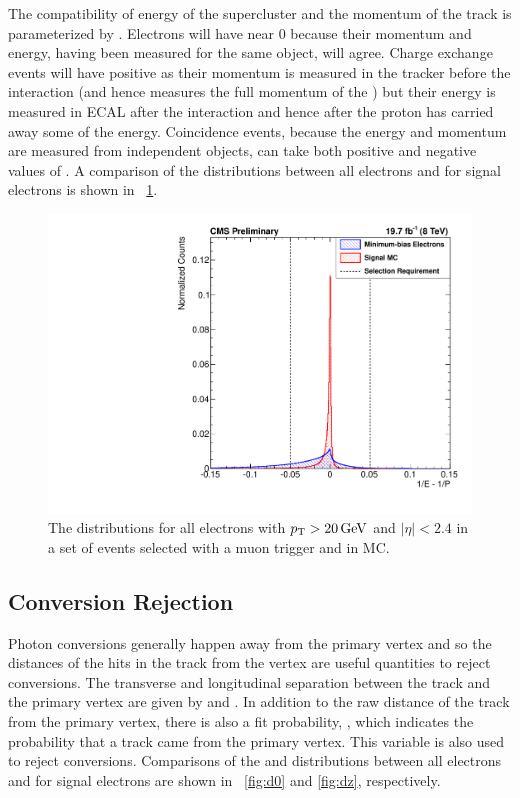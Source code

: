 The compatibility of energy of the supercluster and the momentum of the track
is parameterized by \ooeoop. Electrons will have \ooeoop near \num{0} because
their momentum and energy, having been measured for the same object, will
agree. Charge exchange events will have positive \ooeoop as their momentum is
measured in the tracker before the interaction (and hence measures the full
momentum of the \pionplus) but their energy is measured in ECAL after the
interaction and hence after the proton has carried away some of the energy.
Coincidence events, because the energy and momentum are measured from
independent objects, can take both positive and negative values of \ooeoop. A
comparison of the \ooeoop distributions between all electrons and for signal
electrons is shown in \FIG~\ref{fig:ooeoop}.

\begin{figure}[!htbp]
    \centering
    \includegraphics[width=\StackedPlotWidth]{figures/e_reco_var_1oe_1op.pdf}
    \caption[
        Distributions of \ooeoop in data and MC.
    ]{
        The \ooeoop distributions for all electrons with $p_{\mathrm{T}} > 20 \,\text{Ge\hspace{-.08em}V}$ and
        $|\eta| < 2.4$ in a set of events selected with a muon trigger and in
        \MADGRAPH \Ztoee MC.
    }
    \label{fig:ooeoop}
\end{figure}

\subsection{Conversion Rejection}

Photon conversions generally happen away from the primary vertex and so the
distances of the hits in the track from the vertex are useful quantities to
reject conversions. The transverse and longitudinal separation between the
track and the primary vertex are given by \dzero and \dz. In addition to
the raw distance of the track from the primary vertex, there is also a fit
probability, \pvtx, which indicates the probability that a track came from the
primary vertex. This variable is also used to reject conversions. Comparisons
of the \dzero and \dz distributions between all electrons and for signal
electrons are shown in \FIGS~\ref{fig:d0} and \ref{fig:dz}, respectively.

